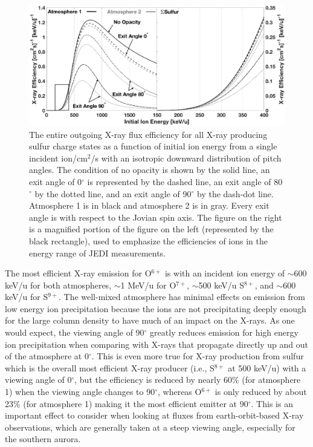 \documentclass[draft]{agujournal2018}
\begin{document}
\begin{figure}
    \centering
    \includegraphics[width=\textwidth]{Figures/SulXrayEff2.eps}
    \caption{The entire outgoing X-ray flux efficiency for all X-ray producing sulfur charge states as a function of initial ion energy from a single incident ion/cm$^2$/s with an isotropic downward distribution of pitch angles. The condition of no opacity is shown by the solid line, an exit angle of 0$^{\circ}$ is represented by the dashed line, an exit angle of 80$^{\circ}$ by the dotted line, and an exit angle of 90$^{\circ}$ by the dash-dot line. Atmosphere 1 is in black and atmosphere 2 is in gray. Every exit angle is with respect to the Jovian spin axis. The figure on the right is a magnified portion of the figure on the left (represented by the black rectangle), used to emphasize the efficiencies of ions in the energy range of JEDI measurements.}
    \label{fig:SulXrayEff}
\end{figure}

The most efficient X-ray emission for O$^{6+}$ is with an incident ion energy of $\sim$600 keV/u for both atmospheres, $\sim$1 MeV/u for O$^{7+}$, $\sim$500 keV/u S$^{8+}$, and $\sim$600 keV/u for S$^{9+}$.
The well-mixed atmosphere has minimal effects on emission from low energy ion precipitation because the ions are not precipitating deeply enough for the large column density to have much of an impact on the X-rays.
As one would expect, the viewing angle of 90$^{\circ}$ greatly reduces emission for high energy ion precipitation when comparing with X-rays that propagate directly up and out of the atmosphere at 0$^{\circ}$.
This is even more true for X-ray production from sulfur which is the overall most efficient X-ray producer (i.e., S$^{8+}$ at 500 keV/u) with a viewing angle of 0$^{\circ}$, but the efficiency is reduced by nearly 60$\%$ (for atmosphere 1) when the viewing angle changes to 90$^{\circ}$, whereas O$^{6+}$ is only reduced by about 23$\%$ (for atmosphere 1) making it the most efficient emitter at 90$^{\circ}$.
This is an important effect to consider when looking at fluxes from earth-orbit-based X-ray observations, which are generally taken at a steep viewing angle, especially for the southern aurora.
\end{document}
